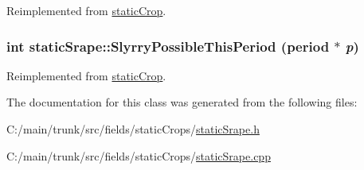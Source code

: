 Reimplemented from \hyperlink{classstatic_crop_ae4f07498c1616eab212386faf352d348}{staticCrop}.\hypertarget{classstatic_srape_a1af4f87d4fb9f95534a1c9ca78e4c523}{
\subsubsection[{SlyrryPossibleThisPeriod}]{\setlength{\rightskip}{0pt plus 5cm}int staticSrape::SlyrryPossibleThisPeriod ({\bf period} $\ast$ {\em p})}}
\label{classstatic_srape_a1af4f87d4fb9f95534a1c9ca78e4c523}


Reimplemented from \hyperlink{classstatic_crop_ada7c8c797de629277a5ba0b0a4a3c17e}{staticCrop}.

The documentation for this class was generated from the following files:\begin{DoxyCompactItemize}
\item 
C:/main/trunk/src/fields/staticCrops/\hyperlink{static_srape_8h}{staticSrape.h}\item 
C:/main/trunk/src/fields/staticCrops/\hyperlink{static_srape_8cpp}{staticSrape.cpp}\end{DoxyCompactItemize}
